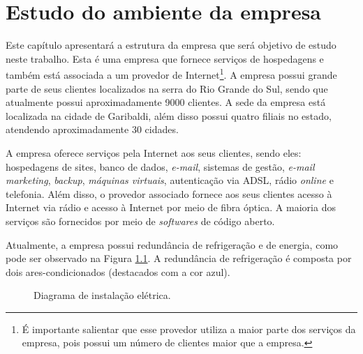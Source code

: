 \chapter{Estudo do ambiente da empresa}
\label{cap:estudodecaso}

Este capítulo apresentará a estrutura da empresa que será objetivo de estudo neste trabalho. Esta é uma empresa que fornece serviços de 
hospedagens e também está associada a um provedor de Internet\footnote[1]{É importante salientar que esse provedor utiliza a maior parte dos 
serviços da empresa, pois possui um número de clientes maior que a empresa.}. A empresa possui grande parte de seus clientes localizados na 
serra do Rio Grande do Sul, sendo que atualmente possui aproximadamente 9000 clientes. A sede da empresa está localizada na cidade de 
Garibaldi, além disso possui quatro filiais no estado, atendendo aproximadamente 30 cidades.

A empresa oferece serviços pela Internet aos seus clientes, sendo eles: hospedagens de sites, banco de dados, \textit{e-mail}, sistemas de gestão, 
\textit{e-mail marketing}, \textit{backup}, \textit{máquinas virtuais}, autenticação via \ac{ADSL}, rádio \textit{online} e telefonia.
Além disso, o provedor associado fornece aos seus clientes acesso à Internet via rádio e acesso à Internet por meio de fibra óptica.
A maioria dos serviços são fornecidos por meio de \textit{softwares} de código aberto.

Atualmente, a empresa possui redundância de refrigeração e de energia, como pode ser observado na Figura \ref{fig:insteletrica}. 
A redundância de refrigeração é composta por dois ares-condicionados (destacados com a cor azul). 

\begin{figure}[h!]
 \centering
 \caption{Diagrama de instalação elétrica.}
 \label{fig:insteletrica}
\end{figure}

